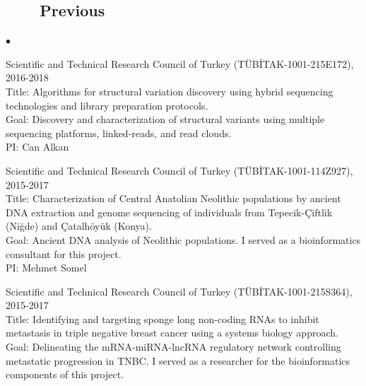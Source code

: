 \documentclass[margin,line]{res}
\newenvironment{list2}{
  \begin{list}{$\bullet$}{%
      \setlength{\itemsep}{0in}
      \setlength{\parsep}{0in} \setlength{\parskip}{0in}
      \setlength{\topsep}{0in} \setlength{\partopsep}{0in} 
      \setlength{\leftmargin}{0.2in}}}{\end{list}}
\begin{document}
\begin{resume}
                                       \subsection{\small \sc ~~~~Previous}
                                       \begin{list2}
                                       \item
                                         Scientific and Technical Research Council of Turkey (T\"{U}B\.{I}TAK-1001-215E172), 2016-2018\\
                                         Title: Algorithms for structural variation discovery using hybrid sequencing technologies and library preparation protocols.\\
                                         Goal: Discovery and characterization of structural variants using multiple sequencing platforms, linked-reads, and read clouds.\\
                                         PI: Can Alkan
                                       \item
                                         Scientific and Technical Research Council of Turkey (T\"{U}B\.{I}TAK-1001-114Z927), 2015-2017\\
                                         Title: Characterization of Central Anatolian Neolithic populations by ancient DNA extraction and genome sequencing of individuals 
                                         from Tepecik-Çiftlik (Niğde) and Çatalhöyük (Konya).\\
                                         Goal: Ancient DNA analysis of Neolithic populations. I served as a bioinformatics consultant for this project.\\
                                         PI: Mehmet Somel
                                       \item
                                         Scientific and Technical Research Council of Turkey (T\"{U}B\.{I}TAK-1001-215S364), 2015-2017\\
                                         Title: Identifying and targeting sponge long non-coding RNAs to inhibit metastasis in triple negative breast cancer
                                         using a systems biology approach.\\
                                         Goal: Delineating the mRNA-miRNA-lncRNA regulatory network controlling metastatic progression in TNBC. I served as a researcher 
                                         for the bioinformatics components of this project.\\

\end{list2}
\end{resume}
\end{document}
